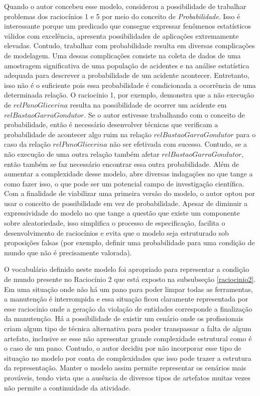 Quando o autor concebeu esse modelo, considerou a possibilidade de trabalhar problemas dos raciocínios 1 e 5 por meio do conceito de \textit{Probabilidade}. Isso é interessante porque um predicado que consegue expressar fenômenos estatísticos válidos com excelência, apresenta possibilidades de aplicações extremamente elevadas. Contudo, trabalhar com probabilidade resulta em diversas complicações de modelagem. Uma dessas complicações consiste na coleta de dados de uma amostragem significativa de uma população de acidentes e na análise estatística adequada para descrever a probabilidade de um acidente acontecer. Entretanto, isso não é o suficiente pois essa probabilidade é condicionada a ocorrência de uma determinada relação. O raciocínio 1, por exemplo, demonstra que a não execução de $relPanoGlicerina$ resulta na possibilidade de ocorrer um acidente em $relBastaoGarraGondutor$. Se o autor estivesse trabalhando com o conceito de probabilidade, então é necessário desenvolver técnicas que verificam a probabilidade de acontecer algo ruim na relação $relBastaoGarraGondutor$ para o caso da relação $relPanoGlicerina$ não ser efetivada com sucesso. Contudo, se a não execução de uma outra relação também afetar $relBastaoGarraGondutor$, então também se faz necessário encontrar essa outra probabilidade. Além de aumentar a complexidade desse modelo, abre diversas indagações no que tange a como fazer isso, o que pode ser um potencial campo de investigação científica. Com a finalidade de viabilizar uma primeira versão do modelo, o autor optou por usar o conceito de possibilidade em vez de probabilidade. Apesar de diminuir a expressividade do modelo no que tange a questão que existe um componente sobre aleatoriedade, isso simplifica o processo de especificação, facilita o desenvolvimento de raciocínios e evita que o modelo seja estruturado sob proposições falsas (por exemplo, definir uma probabilidade para uma condição de mundo que não é precisamente valorada). 

O vocabulário definido neste modelo foi apropriado para representar a condição de mundo presente no Raciocínio 2 que está exposto na subsubseção \ref{raciocinio2}. Em uma situação onde não há um pano para poder limpar todas as ferramentas, a manutenção é interrompida e essa situação ficou claramente representada por esse raciocínio onde a geração da violação de entidades corresponde a finalização da manutenção. Há a possibilidade de existir um cenário onde os profissionais criam algum tipo de técnica alternativa para poder transpassar a falta de algum artefato, inclusive se esse não apresentar grande complexidade estrutural como é o caso de um pano. Contudo, o autor decidiu por não incorporar esse tipo de situação no modelo por conta de complexidades que isso pode trazer a estrutura da representação. Manter o modelo assim permite representar os cenários mais prováveis, tendo vista que a ausência de diversos tipos de artefatos muitas vezes não permite a continuidade da atividade.    

